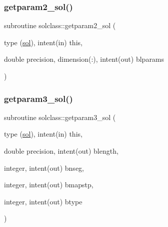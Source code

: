 \mbox{\label{namespacesolclass_aab6c073c4b20670742987b17bcb8366d}} 
\subsubsection{\texorpdfstring{getparam2\_sol()}{getparam2\_sol()}}
{\footnotesize\ttfamily subroutine solclass\+::getparam2\+\_\+sol (\begin{DoxyParamCaption}\item[{type (\mbox{\hyperlink{namespacesolclass_structsolclass_1_1sol}{sol}}), intent(in)}]{this,  }\item[{double precision, dimension(\+:), intent(out)}]{blparams }\end{DoxyParamCaption})}

\mbox{\label{namespacesolclass_a11962a787b8bed31dd906ac4a5e2853e}} 
\subsubsection{\texorpdfstring{getparam3\_sol()}{getparam3\_sol()}}
{\footnotesize\ttfamily subroutine solclass\+::getparam3\+\_\+sol (\begin{DoxyParamCaption}\item[{type (\mbox{\hyperlink{namespacesolclass_structsolclass_1_1sol}{sol}}), intent(in)}]{this,  }\item[{double precision, intent(out)}]{blength,  }\item[{integer, intent(out)}]{bnseg,  }\item[{integer, intent(out)}]{bmapstp,  }\item[{integer, intent(out)}]{btype }\end{DoxyParamCaption})}

\mbox{\label{namespacesolclass_a195ad6d94c20d0ac4d6ed1c8063a8a3b}} 

